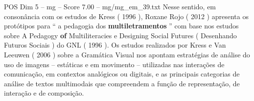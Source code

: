 \begin{textsample}{POS Dim 5 – mg – Score 7.00 – mg/mg\_em\_39.txt}
Nesse sentido, em consonância com os estudos de Kress ( 1996 ), Roxane Rojo ( 2012 ) apresenta os protótipos para “ a pedagogia dos \textbf{multiletramentos} ” com base nos estudos sobre A Pedagogy \textbf{of} Multiliteracies e Designing Social Futures ( Desenhando Futuros Sociais ) do GNL ( 1996 ).
Os estudos realizados por Kress e Van Leeuwen ( 2006 ) sobre a Gramática Visual nos apontam estratégias de análise do uso de imagens – estáticas e em movimento – utilizadas nas interações de comunicação, em contextos analógicos ou digitais, e as principais categorias de análise de textos multimodais que compreendem a função de representação, de interação e de composição.

\end{textsample}
